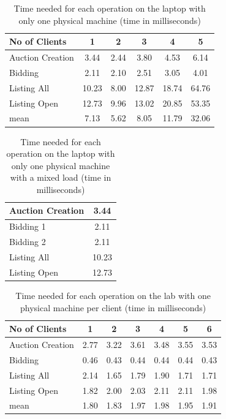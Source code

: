 \documentclass[twocolumn,10pt]{article}
\begin{document}
\begin{table}
\label{tbltpo}
\begin{center}
\begin{tabular}{ | l | c | c | c | c | c |}
\hline
No of Clients & 1 & 2 & 3 & 4 & 5 \\
\hline
Auction Creation & 3.44 & 2.44 & 3.80 & 4.53 & 6.14 \\
Bidding & 2.11 & 2.10 & 2.51 & 3.05 & 4.01 \\
Listing All & 10.23 & 8.00 & 12.87 & 18.74 & 64.76 \\
Listing Open & 12.73 & 9.96 & 13.02 & 20.85 & 53.35 \\
\hline
mean & 7.13 & 5.62 & 8.05 & 11.79 & 32.06 \\
\hline  
\end{tabular}
\end{center}
\caption{Time needed for each operation on the laptop with only one physical machine (time in milliseconds)}
\end{table}

\begin{table}
\label{tbltpm}
\begin{center}
\begin{tabular}{ | l | c | }
\hline
Auction Creation & 3.44 \\
\hline
Bidding 1 & 2.11\\
\hline
Bidding 2 & 2.11\\
\hline
Listing All & 10.23\\
\hline
Listing Open & 12.73 \\
\hline
\end{tabular}
\end{center}
\caption{Time needed for each operation on the laptop with only one physical machine with a mixed load (time in milliseconds)}
\end{table}

\begin{table}
\label{tblab}
\begin{center}
\begin{tabular}{ | l | c | c | c | c | c | c |}
\hline
No of Clients & 1 & 2 & 3 & 4 & 5 & 6 \\
\hline
Auction Creation & 2.77 & 3.22 & 3.61 & 3.48 & 3.55 & 3.53 \\
Bidding & 0.46 & 0.43 & 0.44 & 0.44 & 0.44 & 0.43 \\
Listing All & 2.14 & 1.65 & 1.79 & 1.90 & 1.71 & 1.71 \\
Listing Open & 1.82 & 2.00 & 2.03 & 2.11 & 2.11 & 1.98 \\
\hline
mean & 1.80 & 1.83 & 1.97 & 1.98 & 1.95 & 1.91 \\
\hline  
\end{tabular}
\end{center}
\caption{Time needed for each operation on the lab with one physical machine per client (time in milliseconds)}
\end{table}
\end{document}
